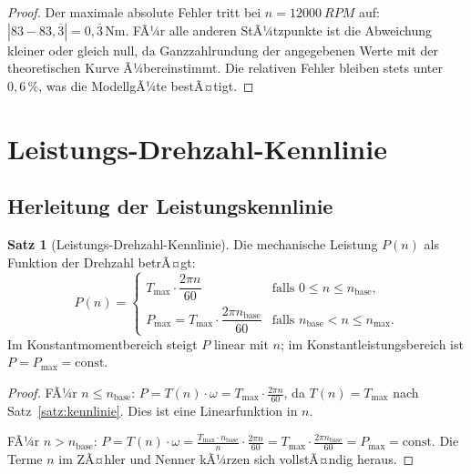 ﻿\documentclass[a4paper,12pt]{article}
\theoremstyle{definition}
\newtheorem{satz}{Satz}
\begin{document}
\begin{proof}
    Der maximale absolute Fehler tritt bei $n = \SI{12000}{RPM}$ auf:
    $|83 - 83{,}\overline{3}| = 0{,}\overline{3}\,\si{\newton\metre}$. FÃ¼r alle
    anderen StÃ¼tzpunkte ist die Abweichung kleiner oder gleich null, da
    Ganzzahlrundung der angegebenen Werte mit der theoretischen Kurve Ã¼bereinstimmt.
    Die relativen Fehler bleiben stets unter $0{,}6\,\%$, was die ModellgÃ¼te bestÃ¤tigt.
\end{proof}

\section{Leistungs-Drehzahl-Kennlinie}
\label{sec:leistung}

\subsection{Herleitung der Leistungskennlinie}

\begin{satz}[Leistungs-Drehzahl-Kennlinie]
\label{satz:leistung}
    Die mechanische Leistung $P(n)$ als Funktion der Drehzahl betrÃ¤gt:
    \[
        P(n) =
        \begin{cases}
            T_{\max} \cdot \dfrac{2\pi n}{60}             & \text{falls } 0 \leq n \leq n_{\mathrm{base}}, \\[6pt]
            P_{\max} = T_{\max} \cdot \dfrac{2\pi n_{\mathrm{base}}}{60} & \text{falls } n_{\mathrm{base}} < n \leq n_{\max}.
        \end{cases}
    \]
    Im Konstantmomentbereich steigt $P$ linear mit $n$; im Konstantleistungsbereich
    ist $P = P_{\max} = \mathrm{const}$.
\end{satz}

\begin{proof}
    FÃ¼r $n \leq n_{\mathrm{base}}$: $P = T(n) \cdot \omega = T_{\max} \cdot \frac{2\pi n}{60}$,
    da $T(n) = T_{\max}$ nach Satz~\ref{satz:kennlinie}. Dies ist eine Linearfunktion in $n$.

    FÃ¼r $n > n_{\mathrm{base}}$: $P = T(n) \cdot \omega =
    \frac{T_{\max} \cdot n_{\mathrm{base}}}{n} \cdot \frac{2\pi n}{60}
    = T_{\max} \cdot \frac{2\pi n_{\mathrm{base}}}{60} = P_{\max} = \mathrm{const}$.
    Die Terme $n$ im ZÃ¤hler und Nenner kÃ¼rzen sich vollstÃ¤ndig heraus.
\end{proof}
\end{document}
